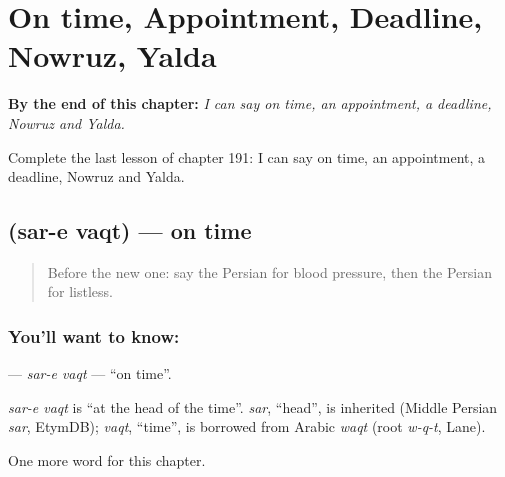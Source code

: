
\chapter{On time, Appointment, Deadline, Nowruz, Yalda}
\label{ch:fa-on-time-appointment-deadline-nowruz-yalda}

\begin{chapteropening}
\textbf{By the end of this chapter:} \emph{I can say on time, an appointment, a deadline, Nowruz and Yalda.}

Complete the last lesson of chapter 191: I can say on time, an appointment, a deadline, Nowruz and Yalda.
\end{chapteropening}

\section[\texorpdfstring{\fa{سر} \fa{وقت} (sar-e vaqt)}{سر وقت (sar-e vaqt)}]{  (sar-e vaqt) — on time}

\label{lesson:FA-C191-sar-e-vaqt}



\begin{quote}
Before the new one: say the Persian for blood pressure, then the Persian for listless.
\end{quote}

\subsection*{You'll want to know:  }
\textbf{ } — \emph{sar-e vaqt} — \textquotedblleft{}on time\textquotedblright{}.

\begin{cousinweb}
\emph{sar-e vaqt} is \textquotedblleft{}at the head of the time\textquotedblright{}. \emph{sar}, \textquotedblleft{}head\textquotedblright{}, is inherited (Middle Persian \emph{sar}, EtymDB); \emph{vaqt}, \textquotedblleft{}time\textquotedblright{}, is borrowed from Arabic \emph{waqt} (root \emph{w-q-t}, Lane).
\end{cousinweb}

\begin{grammarlens}[title={What you've built}]
One more word for this chapter.
\end{grammarlens}

